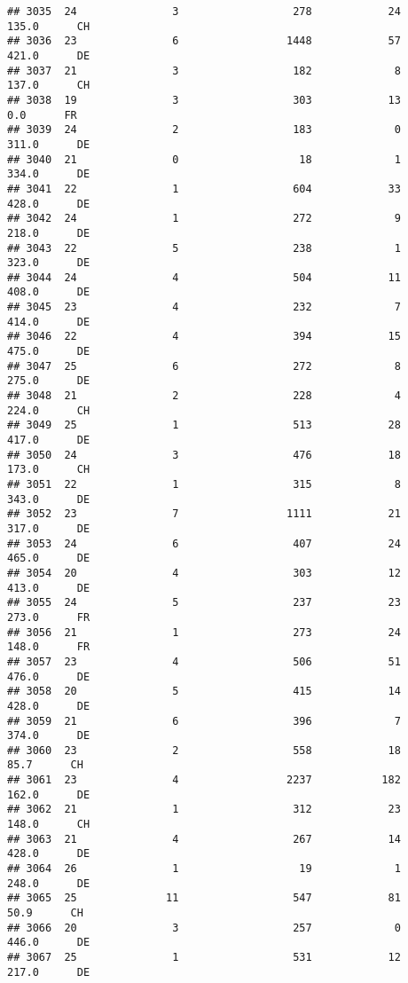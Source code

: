 \documentclass[
]{article}
\begin{document}
\begin{verbatim}
## 3035  24               3                  278            24    135.0      CH
## 3036  23               6                 1448            57    421.0      DE
## 3037  21               3                  182             8    137.0      CH
## 3038  19               3                  303            13      0.0      FR
## 3039  24               2                  183             0    311.0      DE
## 3040  21               0                   18             1    334.0      DE
## 3041  22               1                  604            33    428.0      DE
## 3042  24               1                  272             9    218.0      DE
## 3043  22               5                  238             1    323.0      DE
## 3044  24               4                  504            11    408.0      DE
## 3045  23               4                  232             7    414.0      DE
## 3046  22               4                  394            15    475.0      DE
## 3047  25               6                  272             8    275.0      DE
## 3048  21               2                  228             4    224.0      CH
## 3049  25               1                  513            28    417.0      DE
## 3050  24               3                  476            18    173.0      CH
## 3051  22               1                  315             8    343.0      DE
## 3052  23               7                 1111            21    317.0      DE
## 3053  24               6                  407            24    465.0      DE
## 3054  20               4                  303            12    413.0      DE
## 3055  24               5                  237            23    273.0      FR
## 3056  21               1                  273            24    148.0      FR
## 3057  23               4                  506            51    476.0      DE
## 3058  20               5                  415            14    428.0      DE
## 3059  21               6                  396             7    374.0      DE
## 3060  23               2                  558            18     85.7      CH
## 3061  23               4                 2237           182    162.0      DE
## 3062  21               1                  312            23    148.0      CH
## 3063  21               4                  267            14    428.0      DE
## 3064  26               1                   19             1    248.0      DE
## 3065  25              11                  547            81     50.9      CH
## 3066  20               3                  257             0    446.0      DE
## 3067  25               1                  531            12    217.0      DE

\end{verbatim}
\end{document}
